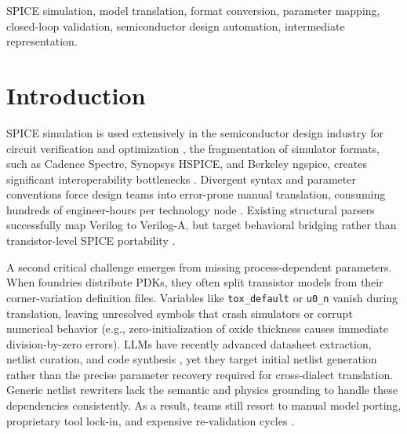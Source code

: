 \documentclass[conference]{IEEEtran}
\begin{document}
\begin{IEEEkeywords}
SPICE simulation, model translation, format conversion, parameter mapping, closed-loop validation, semiconductor design automation, intermediate representation.
\end{IEEEkeywords}

\section{Introduction}
\label{sec:introduction}

 SPICE simulation is used extensively in the semiconductor design industry for circuit verification and optimization \cite{Pratap_2014, Kundert_1995, Vogt_ngspice, a2024_single}, the fragmentation of simulator formats, such as Cadence Spectre, Synopsys HSPICE, and Berkeley ngspice, creates significant interoperability bottlenecks \cite{Chhabria_2025, Goldman_2000}. Divergent syntax and parameter conventions force design teams into error-prone manual translation, consuming hundreds of engineer-hours per technology node \cite{Dahad_2021, spiceerror, engineererror, a2024_kb}. Existing structural parsers successfully map Verilog to Verilog-A, but target behavioral bridging rather than transistor-level SPICE portability \cite{Shao_2023_V2Va, Wang_2024_V2VaPlus}.

A second critical challenge emerges from missing process-dependent parameters. When foundries distribute PDKs, they often split transistor models from their corner-variation definition files. Variables like \texttt{tox\_default} or \texttt{u0\_n} vanish during translation, leaving unresolved symbols that crash simulators or corrupt numerical behavior (e.g., zero-initialization of oxide thickness causes immediate division-by-zero errors). LLMs have recently advanced datasheet extraction, netlist curation, and code synthesis \cite{Chen_2025_D2S, Chen_2024_DocEDA, Bhandari_2024, Vungarala_2024_SPICEPilot}, yet they target initial netlist generation rather than the precise parameter recovery required for cross-dialect translation. Generic netlist rewriters \cite{DallOra_2025} lack the semantic and physics grounding to handle these dependencies consistently. As a result, teams still resort to manual model porting, proprietary tool lock-in, and expensive re-validation cycles \cite{Zhu_2012, spicesec2025}.
\end{document}
